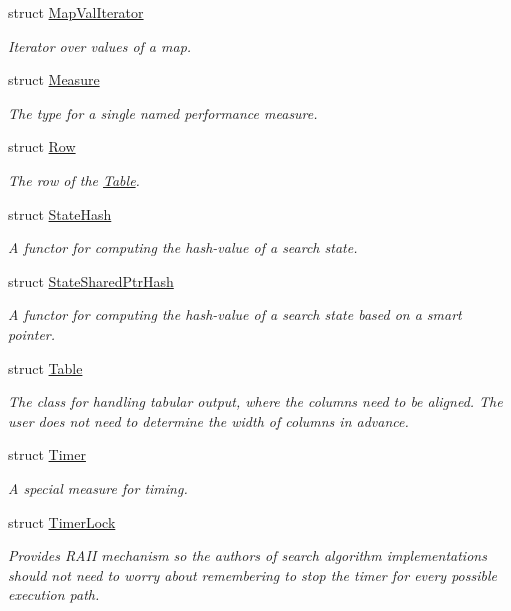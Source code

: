 \begin{DoxyCompactItemize}
struct \hyperlink{structslb_1_1core_1_1util_1_1MapValIterator}{Map\+Val\+Iterator}
\begin{DoxyCompactList}\small\item\em Iterator over values of a map. \end{DoxyCompactList}\item 
struct \hyperlink{structslb_1_1core_1_1util_1_1Measure}{Measure}
\begin{DoxyCompactList}\small\item\em The type for a single named performance measure. \end{DoxyCompactList}\item 
struct \hyperlink{structslb_1_1core_1_1util_1_1Row}{Row}
\begin{DoxyCompactList}\small\item\em The row of the \hyperlink{structslb_1_1core_1_1util_1_1Table}{Table}. \end{DoxyCompactList}\item 
struct \hyperlink{structslb_1_1core_1_1util_1_1StateHash}{State\+Hash}
\begin{DoxyCompactList}\small\item\em A functor for computing the hash-\/value of a search state. \end{DoxyCompactList}\item 
struct \hyperlink{structslb_1_1core_1_1util_1_1StateSharedPtrHash}{State\+Shared\+Ptr\+Hash}
\begin{DoxyCompactList}\small\item\em A functor for computing the hash-\/value of a search state based on a smart pointer. \end{DoxyCompactList}\item 
struct \hyperlink{structslb_1_1core_1_1util_1_1Table}{Table}
\begin{DoxyCompactList}\small\item\em The class for handling tabular output, where the columns need to be aligned. The user does not need to determine the width of columns in advance. \end{DoxyCompactList}\item 
struct \hyperlink{structslb_1_1core_1_1util_1_1Timer}{Timer}
\begin{DoxyCompactList}\small\item\em A special measure for timing. \end{DoxyCompactList}\item 
struct \hyperlink{structslb_1_1core_1_1util_1_1TimerLock}{Timer\+Lock}
\begin{DoxyCompactList}\small\item\em Provides R\+A\+II mechanism so the authors of search algorithm implementations should not need to worry about remembering to stop the timer for every possible execution path. \end{DoxyCompactList}\end{DoxyCompactItemize}
